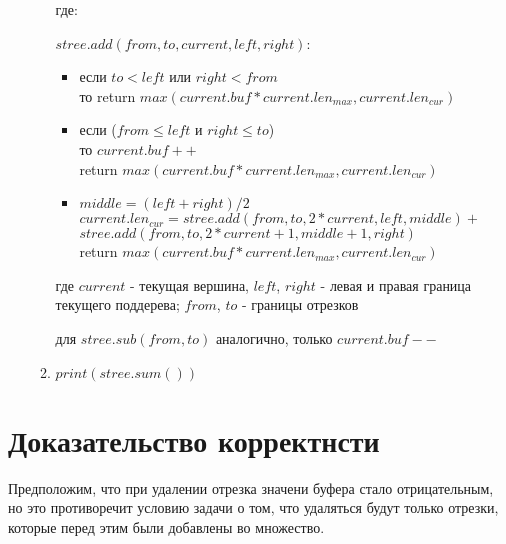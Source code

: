 \documentclass[12pt]{article}
\begin{document}
\begin{enumerate}
\begin{enumerate}
		  где:
		  
		  $stree.add(from, to, current, left, right)$:
		  
		  \begin{itemize}
		  
		  \item если $to < left$ или $right < from$\\
		  		то return $max(current.buf * current.len_{max}, current.len_{cur})$
		  
		  \item если ($from \leq left$ и $right \leq to$)\\
		  		то $current.buf++$\\
		  			 return $max(current.buf * current.len_{max}, current.len_{cur})$ 
		  
		  \item $middle = (left + right)/2$\\
		  		$current.len_{cur} = stree.add(from, to, 2*current, left, middle)  +$\\ $stree.add(from, to, 2*current+1, middle+1, right)$\\
		  		return $max(current.buf * current.len_{max}, current.len_{cur})$ 
		  
		  
		  \end{itemize}
		  
		  где $current$ - текущая вершина, $left$, $right$ - левая и правая граница текущего поддерева; $from$, $to$ - границы отрезков
		  
		  для $stree.sub(from, to)$ аналогично, только $current.buf--$
	
	\item $print(stree.sum())$\\

	\end{enumerate}
		
\end{enumerate}
		
	

\section{Доказательство корректнсти}
Предположим, что при удалении отрезка значени буфера стало отрицательным, но это противоречит условию задачи о том, что удаляться будут только отрезки, которые перед этим были добавлены во множество. 
\end{document}
